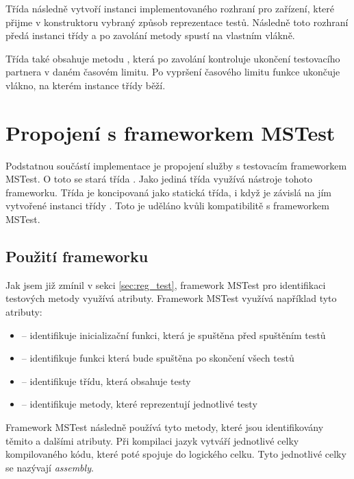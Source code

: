 Třída následně vytvoří instanci implementovaného rozhraní pro zařízení, které přijme v konstruktoru vybraný způsob reprezentace testů. Následně toto rozhraní předá instanci třídy  a po zavolání metody  spustí  na vlastním vlákně.

Třída také obsahuje metodu , která po zavolání kontroluje ukončení testovacího partnera v daném časovém limitu. Po vypršení časového limitu funkce ukončuje vlákno, na kterém instance třídy  běží.


\section{Propojení s frameworkem MSTest}

Podstatnou součástí implementace je propojení služby s testovacím frameworkem MSTest. O toto se stará třída . Jako jediná třída využívá nástroje tohoto frameworku. Třída je koncipovaná jako statická třída, i když je závislá na jím vytvořené instanci třídy . Toto je uděláno kvůli kompatibilitě s frameworkem MSTest. 


\subsection{Použití frameworku}
Jak jsem již zmínil v sekci \ref{sec:reg_test}, framework MSTest pro identifikaci testových metody využívá atributy. Framework MSTest využívá například tyto atributy:

\begin{itemize}
    \item {} -- identifikuje inicializační funkci, která je spuštěna před spuštěním testů \cite{attr_init_clean}
    \item {} -- identifikuje funkci která bude spuštěna po skončení všech testů \cite{attr_init_clean}
    \item {} -- identifikuje třídu, která obsahuje testy \cite{mstest_docs}
    \item {} -- identifikuje metody, které reprezentují jednotlivé  testy \cite{mstest_docs}
\end{itemize}

Framework MSTest následně používá tyto metody, které jsou identifikovány těmito a dalšími atributy. Při kompilaci jazyk \csharp{} vytváří jednotlivé celky kompilovaného kódu, které poté spojuje do logického celku. Tyto jednotlivé celky se nazývají \textit{assembly}. \cite{assembly}

